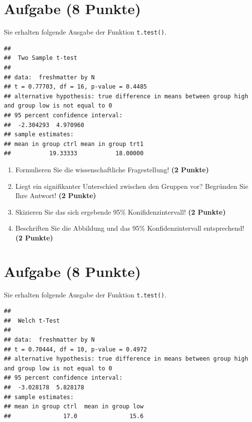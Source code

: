 \documentclass[a4paper, 10pt]{scrartcl}\usepackage[]{graphicx}\usepackage[]{xcolor}
\makeatletter
\newenvironment{kframe}{%
 \def\at@end@of@kframe{}%
 \ifinner\ifhmode%
  \def\at@end@of@kframe{\end{minipage}}%
  \begin{minipage}{\columnwidth}%
 \fi\fi%
 \def\FrameCommand##1{\hskip\@totalleftmargin \hskip-\fboxsep
 \colorbox{shadecolor}{##1}\hskip-\fboxsep
     \hskip-\linewidth \hskip-\@totalleftmargin \hskip\columnwidth}%
 \MakeFramed {\advance\hsize-\width
   \@totalleftmargin\z@ \linewidth\hsize
   \@setminipage}}%
 {\par\unskip\endMakeFramed%
 \at@end@of@kframe}
\newenvironment{knitrout}{}{} %
\makeatother
\begin{document}
\section{Aufgabe \hfill (8 Punkte)}

Sie erhalten folgende \Rlogo Ausgabe der Funktion \texttt{t.test()}.

\begin{knitrout}
\color{fgcolor}\begin{kframe}
\begin{verbatim}
## 
## 	Two Sample t-test
## 
## data:  freshmatter by N
## t = 0.77703, df = 16, p-value = 0.4485
## alternative hypothesis: true difference in means between group high and group low is not equal to 0
## 95 percent confidence interval:
##  -2.304293  4.970960
## sample estimates:
## mean in group ctrl mean in group trt1 
##           19.33333           18.00000
\end{verbatim}
\end{kframe}
\end{knitrout}


\begin{enumerate}
  \item Formulieren Sie die wissenschaftliche Fragestellung! \textbf{(2
Punkte)}
\item Liegt ein signifikanter Unterschied zwischen den Gruppen vor?
  Begr{\"u}nden Sie Ihre Antwort! \textbf{(2 Punkte)}
\item Skizieren Sie das sich ergebende 95\% Konifidenzintervall! \textbf{(2 Punkte)}
\item Beschriften Sie die Abbildung und
  das 95\% Konfidenzintervall entsprechend! \textbf{(2 Punkte)}  
\end{enumerate} 
\clearpage

\section{Aufgabe \hfill (8 Punkte)}

Sie erhalten folgende \Rlogo Ausgabe der Funktion \texttt{t.test()}.

\begin{knitrout}
\color{fgcolor}\begin{kframe}
\begin{verbatim}
## 
## 	Welch t-Test
## 
## data:  freshmatter by N
## t = 0.70444, df = 10, p-value = 0.4972
## alternative hypothesis: true difference in means between group high and group low is not equal to 0
## 95 percent confidence interval:
##  -3.028178  5.828178
## sample estimates:
## mean in group ctrl  mean in group low 
##               17.0               15.6
\end{verbatim}
\end{kframe}
\end{knitrout}
\end{document}
